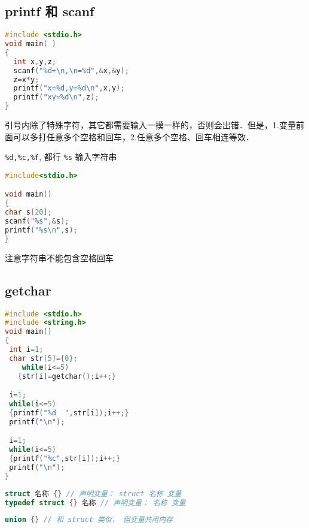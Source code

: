 

\begin{issues}
\issueDraft
\end{issues}

\subsection{printf 和 scanf}
\begin{lstlisting}[language=cpp]
#include <stdio.h>
void main( )
{
  int x,y,z;
  scanf("%d+\n,\n=%d",&x,&y);
  z=x*y;
  printf("x=%d,y=%d\n",x,y);
  printf("xy=%d\n",z);
}
\end{lstlisting}
引号内除了特殊字符，其它都需要输入一摸一样的，否则会出错．但是，1.变量前面可以多打任意多个空格和回车，2.任意多个空格、回车相连等效．
 
\verb|%d,%c,%f|, 都行 \verb|%s| 输入字符串
\begin{lstlisting}[language=cpp]
#include<stdio.h>

void main()
{
char s[20];
scanf("%s",&s);
printf("%s\n",s);
}
\end{lstlisting}
注意字符串不能包含空格回车

\subsection{getchar}
\begin{lstlisting}[language=cpp]
#include <stdio.h>
#include <string.h>
void main()
{
 int i=1;
 char str[5]={0};
    while(i<=5)
   {str[i]=getchar();i++;}

 i=1;
 while(i<=5)
 {printf("%d  ",str[i]);i++;}
 printf("\n");

 i=1;
 while(i<=5)
 {printf("%c",str[i]);i++;}
 printf("\n");
}
\end{lstlisting}

\begin{lstlisting}[language=cpp]
struct 名称 {} // 声明变量： struct 名称 变量
typedef struct {} 名称 // 声明变量： 名称 变量
\end{lstlisting}

\begin{lstlisting}[language=cpp]
union {} // 和 struct 类似， 但变量共用内存
\end{lstlisting}
